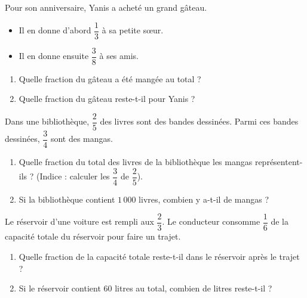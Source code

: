 \documentclass[a4paper]{book}
\begin{document}
    
    \begin{exercice}
        Pour son anniversaire, Yanis a acheté un grand gâteau. 
        \begin{itemize}
            \item Il en donne d'abord $\dfrac{1}{3}$ à sa petite sœur.
            \item Il en donne ensuite $\dfrac{3}{8}$ à ses amis.
        \end{itemize}
        
        \begin{enumerate}
            \item Quelle fraction du gâteau a été mangée au total ?
            \item Quelle fraction du gâteau reste-t-il pour Yanis ?
        \end{enumerate}
    \end{exercice}
    
    
    \begin{exercice}
        Dans une bibliothèque, $\dfrac{2}{5}$ des livres sont des bandes dessinées. Parmi ces bandes dessinées, $\dfrac{3}{4}$ sont des mangas.
        \begin{enumerate}
            \item Quelle fraction du total des livres de la bibliothèque les mangas représentent-ils ? (Indice : calculer les $\dfrac{3}{4}$ de $\dfrac{2}{5}$).
            \item Si la bibliothèque contient $1\,000$ livres, combien y a-t-il de mangas ?
        \end{enumerate}
    \end{exercice}
    
    
    \begin{exercice}
        Le réservoir d'une voiture est rempli aux $\dfrac{2}{3}$. Le conducteur consomme $\dfrac{1}{6}$ de la capacité totale du réservoir pour faire un trajet.
        \begin{enumerate}
            \item Quelle fraction de la capacité totale reste-t-il dans le réservoir après le trajet ?
            \item Si le réservoir contient $60$ litres au total, combien de litres reste-t-il ?
        \end{enumerate}
    \end{exercice}
    
\end{document}
